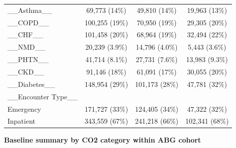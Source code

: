 \documentclass[
  11pt,
  letterpaper,
  DIV=11,
  numbers=noendperiod]{scrartcl}
\begin{document}
\begin{longtable*}{>{\raggedright\arraybackslash}p{2.0in}ccc}
\_\_Asthma\_\_ & 69,773 (14\%) & 49,810 (14\%) & 19,963 (13\%)\\
\addlinespace
\_\_COPD\_\_ & 100,255 (19\%) & 70,950 (19\%) & 29,305 (20\%)\\
\_\_CHF\_\_ & 101,458 (20\%) & 68,964 (19\%) & 32,494 (22\%)\\
\_\_NMD\_\_ & 20,239 (3.9\%) & 14,796 (4.0\%) & 5,443 (3.6\%)\\
\_\_PHTN\_\_ & 41,714 (8.1\%) & 27,731 (7.6\%) & 13,983 (9.3\%)\\
\_\_CKD\_\_ & 91,146 (18\%) & 61,091 (17\%) & 30,055 (20\%)\\
\addlinespace
\_\_Diabetes\_\_ & 148,954 (29\%) & 101,173 (28\%) & 47,781 (32\%)\\
\_\_Encounter Type\_\_ &  &  & \\
Emergency & 171,727 (33\%) & 124,405 (34\%) & 47,322 (32\%)\\
Inpatient & 343,559 (67\%) & 241,218 (66\%) & 102,341 (68\%)\\*
\end{longtable*}
\endgroup{}

\FloatBarrier\nopagebreak

\par

\noindent

\begin{center}\textbf{Baseline summary by CO2 category within ABG cohort}\end{center}

\begingroup\fontsize{7}{9}\selectfont
\end{document}
